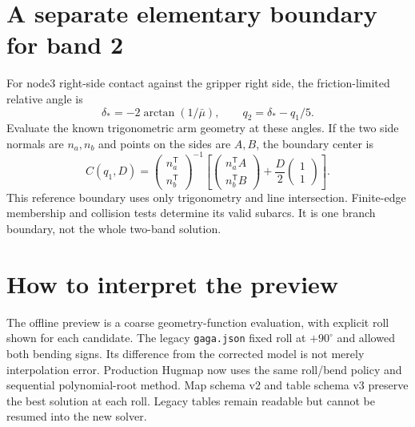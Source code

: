 \documentclass{article}
\begin{document}
\section{A separate elementary boundary for band 2}
For node3 right-side contact against the gripper right side, the friction-limited relative angle is
\[
\delta_*=-2\arctan(1/\bar\mu),\qquad q_2=\delta_*-q_1/5.
\]
Evaluate the known trigonometric arm geometry at these angles. If the two side normals are $n_a,n_b$ and points on the sides are $A,B$, the boundary center is
\[
\boxed{C(q_1,D)=
\begin{pmatrix}n_a^\mathsf T\\ n_b^\mathsf T\end{pmatrix}^{-1}
\left[\begin{pmatrix}n_a^\mathsf TA\\n_b^\mathsf TB\end{pmatrix}
+\frac D2\begin{pmatrix}1\\1\end{pmatrix}\right].}
\]
This reference boundary uses only trigonometry and line intersection. Finite-edge membership and collision tests determine its valid subarcs. It is one branch boundary, not the whole two-band solution.

\section{How to interpret the preview}
The offline preview is a coarse geometry-function evaluation, with explicit roll shown for each candidate. The legacy \texttt{gaga.json} fixed roll at $+90^\circ$ and allowed both bending signs. Its difference from the corrected model is not merely interpolation error. Production Hugmap now uses the same roll/bend policy and sequential polynomial-root method. Map schema v2 and table schema v3 preserve the best solution at each roll. Legacy tables remain readable but cannot be resumed into the new solver.
\end{document}
